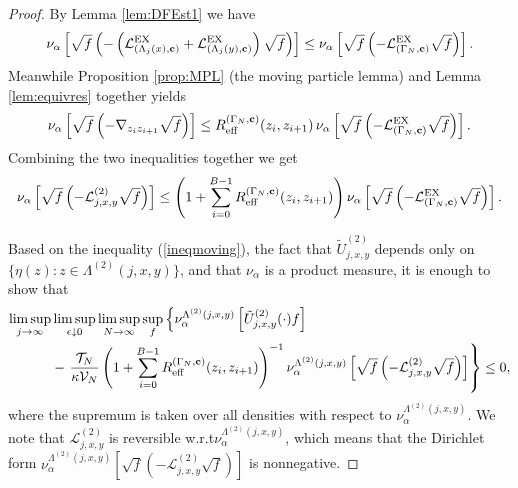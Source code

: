\documentclass[11pt]{amsart}
\theoremstyle{plain}
\theoremstyle{definition}
\theoremstyle{remark}
\begin{document}
\begin{proof}
By Lemma \ref{lem:DFEst1} we have
\begin{align*}
\nu_\alpha \left[\sqrt{f}\left( -\left(\mathcal{L}^{\rm EX}_{(\Lambda_j(x),{\bf c})} + \mathcal{L}^{\rm EX}_{(\Lambda_j(y), {\bf c})}\right)\sqrt{f}\right)\right] \leq  \nu_\alpha \left[ \sqrt{f}\left(-\mathcal{L}^{\rm EX}_{(\Gamma_N,{\bf c})} \sqrt{f} \right)\right].
\end{align*}
Meanwhile Proposition \ref{prop:MPL} (the moving particle lemma) and Lemma \ref{lem:equivres} together yields
\begin{align}
\label{mpl2b1}
\nu_\alpha \left[ \sqrt{f}\left( -\nabla_{z_i z_{i+1}}\sqrt{f}\right)\right] \leq R^{(\Gamma_N,{\bf c})}_{\rm eff}(z_i,z_{i+1})\, \nu_\alpha \left[ \sqrt{f}\left( -\mathcal{L}^{\rm EX}_{(\Gamma_N,{\bf c})} \sqrt{f}\right)\right].
\end{align}
Combining the two inequalities together we get
\begin{align}
\label{ineqmoving}
\nu_\alpha \left[\sqrt{f}\left(-\mathcal{L}^{(2)}_{j,x,y}\sqrt{f}\right)\right] \leq \left(1+ \sum_{i=0}^{B-1} R_{\rm eff}^{(\Gamma_N, {\bf c})}(z_i, z_{i+1})\right) \nu_\alpha \left[ \sqrt{f} \left( -\mathcal{L}^{\rm EX}_{(\Gamma_N,{\bf c})}\sqrt{f}\right)\right].
\end{align}

Based on the inequality (\ref{ineqmoving}), the fact that ${\tilde{U}^{(2)}_{{{j}},{{x}},{{y}}}}$ depends only on $\{\eta(z): z \in \Lambda^{(2)}(j,x,y)\}$, and that $\nu_\alpha$ is a product measure, it is enough to show that
\begin{align}
\label{2bsup}
\limsup_{j\to\infty} & \limsup_{\epsilon \downarrow 0} \limsup_{N\to\infty} \sup_f \left\{ \nu_\alpha^{\Lambda^{(2)}(j,x,y)}\left[ {\tilde{U}^{(2)}_{{{j}},{{x}},{{y}}}}(\cdot) f\right] \right. \\ 
\nonumber & - \left.\frac{\mathcal{T}_N}{\kappa \mathcal{V}_N}\left(1+\sum_{i=0}^{B-1} R_{\rm eff}^{(\Gamma_N, {\bf c})}(z_i,z_{i+1})\right)^{-1} \nu_\alpha^{\Lambda^{(2)}(j,x,y)} \left[\sqrt{f}\left( -\mathcal{L}^{(2)}_{j,x,y} \sqrt{f}\right)\right]\right\}\leq 0,
\end{align}
where the supremum is taken over all densities with respect to $\nu_\alpha^{\Lambda^{(2)}(j,x,y)}$. We note that $\mathcal{L}^{(2)}_{j,x,y}$ is reversible w.r.t\@ $\nu_\alpha^{\Lambda^{(2)}(j,x,y)}$, which means that the Dirichlet form $ \nu_\alpha^{\Lambda^{(2)}(j,x,y)} \left[\sqrt{f}\left( -\mathcal{L}^{(2)}_{j,x,y} \sqrt{f}\right)\right]$ is nonnegative.


\end{proof}
\end{document}
